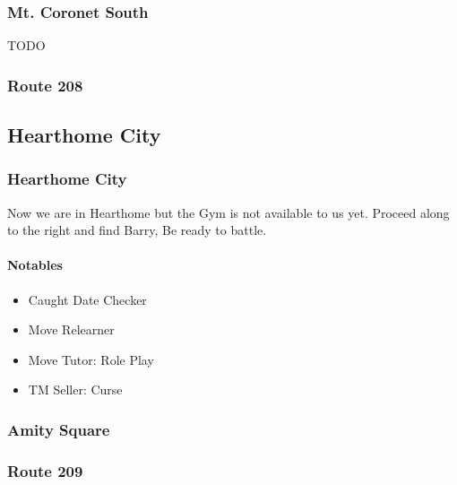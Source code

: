 \documentclass[11pt]{article}
\begin{document}
\subsubsection{Mt. Coronet South}\label{subsubsec:mt.-coronet-south}
TODO

\subsubsection{Route 208}\label{subsubsec:route_208}






\subsection{Hearthome City}\label{subsec:hearthome-city}

\subsubsection{Hearthome City}\label{subsubsec:hearthome-city}
Now we are in Hearthome but the Gym is not available to us yet.
Proceed along to the right and find Barry, Be ready to battle.

\paragraph{Notables}\label{par:notables-hearthome}

\begin{itemize}
    \item Caught Date Checker
    \item Move Relearner
    \item Move Tutor: Role Play
    \item TM Seller: Curse
\end{itemize}

\subsubsection{Amity Square}\label{subsubsec:amity-square}




\subsubsection{Route 209}\label{subsubsec:route_2092}
\end{document}
